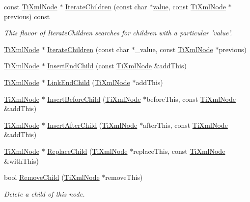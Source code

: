 \begin{DoxyCompactItemize}
\item 
const \hyperlink{class_ti_xml_node}{Ti\-Xml\-Node} $\ast$ \hyperlink{class_ti_xml_node_adfaef35a076b9343adc1420757376c39}{Iterate\-Children} (const char $\ast$\hyperlink{fmod__dsp_8h_a6a4f8a1a444e9080b297963b3db29fe0}{value}, const \hyperlink{class_ti_xml_node}{Ti\-Xml\-Node} $\ast$previous) const 
\begin{DoxyCompactList}\small\item\em This flavor of Iterate\-Children searches for children with a particular 'value'. \end{DoxyCompactList}\item 
\hyperlink{class_ti_xml_node}{Ti\-Xml\-Node} $\ast$ \hyperlink{class_ti_xml_node_a67ba8275e533e6f76340236c42ea0aea}{Iterate\-Children} (const char $\ast$\-\_\-value, const \hyperlink{class_ti_xml_node}{Ti\-Xml\-Node} $\ast$previous)
\item 
\hyperlink{class_ti_xml_node}{Ti\-Xml\-Node} $\ast$ \hyperlink{class_ti_xml_node_ad7d4630e1a2a916edda16be22448a8ba}{Insert\-End\-Child} (const \hyperlink{class_ti_xml_node}{Ti\-Xml\-Node} \&add\-This)
\item 
\hyperlink{class_ti_xml_node}{Ti\-Xml\-Node} $\ast$ \hyperlink{class_ti_xml_node_a5d29442ae46de6d0168429156197bfc6}{Link\-End\-Child} (\hyperlink{class_ti_xml_node}{Ti\-Xml\-Node} $\ast$add\-This)
\item 
\hyperlink{class_ti_xml_node}{Ti\-Xml\-Node} $\ast$ \hyperlink{class_ti_xml_node_a0c146fa2fff0157b681594102f48cbc7}{Insert\-Before\-Child} (\hyperlink{class_ti_xml_node}{Ti\-Xml\-Node} $\ast$before\-This, const \hyperlink{class_ti_xml_node}{Ti\-Xml\-Node} \&add\-This)
\item 
\hyperlink{class_ti_xml_node}{Ti\-Xml\-Node} $\ast$ \hyperlink{class_ti_xml_node_ad9b75e54ec19301c8b4d5ff583d0b3d5}{Insert\-After\-Child} (\hyperlink{class_ti_xml_node}{Ti\-Xml\-Node} $\ast$after\-This, const \hyperlink{class_ti_xml_node}{Ti\-Xml\-Node} \&add\-This)
\item 
\hyperlink{class_ti_xml_node}{Ti\-Xml\-Node} $\ast$ \hyperlink{class_ti_xml_node_a0c49e739a17b9938050c22cd89617fbd}{Replace\-Child} (\hyperlink{class_ti_xml_node}{Ti\-Xml\-Node} $\ast$replace\-This, const \hyperlink{class_ti_xml_node}{Ti\-Xml\-Node} \&with\-This)
\item 
bool \hyperlink{class_ti_xml_node_ae19d8510efc90596552f4feeac9a8fbf}{Remove\-Child} (\hyperlink{class_ti_xml_node}{Ti\-Xml\-Node} $\ast$remove\-This)
\begin{DoxyCompactList}\small\item\em Delete a child of this node. \end{DoxyCompactList}\item 

\end{DoxyCompactItemize}

